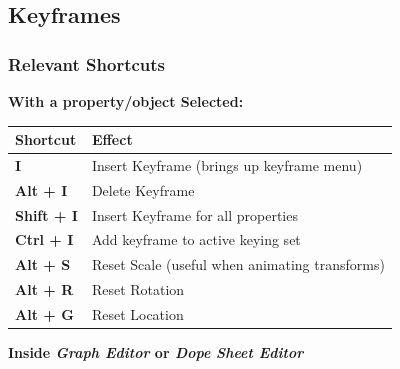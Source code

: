 \documentclass{article}
\begin{document}
\subsection{Keyframes}

\subsubsection{Relevant Shortcuts}
\textbf{With a property/object Selected:}
\begin{longtable}{ll}
    \toprule
    \textbf{Shortcut}  & \textbf{Effect}                                \\
    \midrule
    \endhead
    \bottomrule
    \endfoot

    \textbf{I}         & Insert Keyframe (brings up keyframe menu)      \\
    \textbf{Alt + I}   & Delete Keyframe                                \\
    \textbf{Shift + I} & Insert Keyframe for all properties             \\
    \textbf{Ctrl + I}  & Add keyframe to active keying set              \\
    \textbf{Alt + S}   & Reset Scale (useful when animating transforms) \\
    \textbf{Alt + R}   & Reset Rotation                                 \\
    \textbf{Alt + G}   & Reset Location                                 \\
\end{longtable}
\textbf{Inside \textit{Graph Editor} or \textit{Dope Sheet Editor}}
\end{document}
